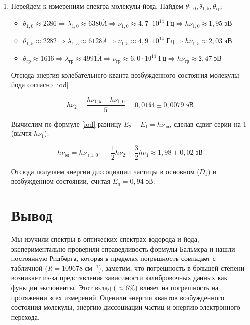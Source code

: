 \documentclass[a4paper, 12pt]{article}%
\newcommand{\x}{\cdot}
\begin{document}
\begin{enumerate}
\item Перейдем к измерениям спектра молекулы йода. Найдем $\theta_{1,0}, \theta_{1,5}, \theta_{\text{гр}}$:

\begin{itemize}
		\item $ \theta_{1, 0} \approx 2386 \Rightarrow \lambda_{1, 0} \approx 6380 \mathring{A} \Rightarrow \nu_{1, 0} \approx 4,7 \x 10^{14} \; Гц \Rightarrow  h \nu_{1, 0} \approx 1,95 \; эВ $
		
		\item $ \theta_{1, 5} \approx 2282 \Rightarrow \lambda_{1, 5} \approx 6128 \mathring{A} \Rightarrow \nu_{1, 5} \approx 4,9 \x 10^{14} \; Гц \Rightarrow  h \nu_{1, 5} \approx 2,03 \; эВ $
			
		\item $ \theta_{гр} \approx 1616 \Rightarrow \lambda_{гр} \approx 4991 \mathring{A} \Rightarrow \nu_{гр} \approx 6,0 \x 10^{14} \; Гц \Rightarrow  h \nu_{гр} \approx 2,47 \; эВ $
	\end{itemize}
	
Отсюда энергия колебательного кванта возбужденного состояния молекулы йода согласно \eqref{iod}
	
	\begin{equation}\label{}
	h\nu_2 = \dfrac{h\nu_{1, 5} - h\nu_{1, 0}}{5} = 0,0164 \pm 0,0079 \; эВ
	\end{equation}
	
	Вычислим по формуле \eqref{iod} разницу $ E_2 - E_1 = h\nu_{эл}$, сделав сдвиг серии на 1 (вычтя $ h\nu_1 $):
	
	\begin{equation}\label{}
	h \nu_{эл} = h \nu_(1,0) - \dfrac{1}{2} h\nu_2 + \dfrac{3}{2}h\nu_1 \approx 1,98  \pm 0,02 \; эВ
	\end{equation}
	
	Отсюда получаем энергии диссоциации частицы в основном ($ D_1 $) и возбужденном состоянии, считая $ E_a = 0,94 $ эВ:
	
	\section{Вывод}
	
	Мы изучили спектры в оптических спектрах водорода и йода, экспериментально проверили справедливость формулы Бальмера и нашли постоянную Ридберга, которая в пределах погрешность совпадает с табличной ($ R = 109 678 \; см^{-1} $), заметим, что погрешность в большей степени возникает из-за представления зависимости калибровочных данных как функции экспоненты. Этот вклад ($ \approx 6\%$) влияет на погрешность на протяжении всех измерений. Оценили энергии квантов возбужденного состояния молекулы, энергию диссоциации частиц и энергию электронного перехода.

\end{enumerate}
\end{document}
